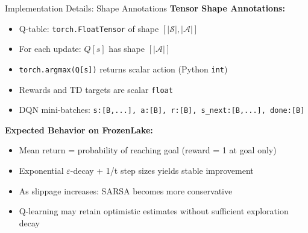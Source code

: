 \documentclass[aspectratio=169,10pt]{beamer}
\begin{document}
\begin{frame}{Implementation Details: Shape Annotations}
\textbf{Tensor Shape Annotations:}
\begin{itemize}
    \item Q-table: \texttt{torch.FloatTensor} of shape $[|\mathcal{S}|, |\mathcal{A}|]$
    \item For each update: $Q[s]$ has shape $[|\mathcal{A}|]$
    \item \texttt{torch.argmax(Q[s])} returns scalar action (Python \texttt{int})
    \item Rewards and TD targets are scalar \texttt{float}
    \item DQN mini-batches: \texttt{s:[B,...], a:[B], r:[B], s\_next:[B,...], done:[B]}
\end{itemize}

\vspace{0.5em}
\textbf{Expected Behavior on FrozenLake:}
\begin{itemize}
    \item Mean return = probability of reaching goal (reward = 1 at goal only)
    \item Exponential $\varepsilon$-decay + 1/t step sizes yields stable improvement
    \item As slippage increases: SARSA becomes more conservative
    \item Q-learning may retain optimistic estimates without sufficient exploration decay
\end{itemize}
\end{frame}
\end{document}
